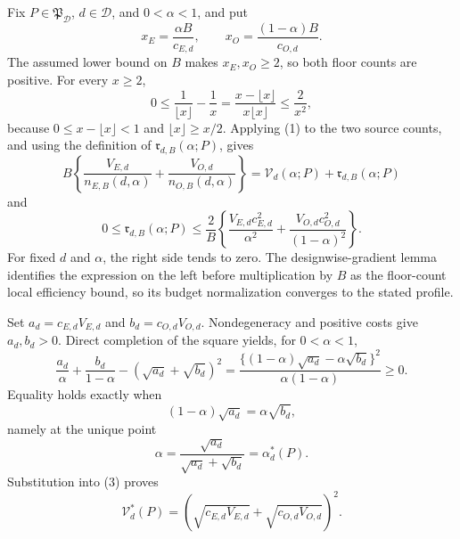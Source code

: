 Fix \(P\in\mathfrak P_{\mathcal D}\), \(d\in\mathcal D\), and \(0<\alpha<1\), and put
\[
 x_E=\frac{\alpha B}{c_{E,d}},\qquad
 x_O=\frac{(1-\alpha)B}{c_{O,d}}.
\]
The assumed lower bound on \(B\) makes \(x_E,x_O\ge2\), so both floor counts are positive.  For every \(x\ge2\),
\[
 0\le \frac1{\lfloor x\rfloor}-\frac1x
 =\frac{x-\lfloor x\rfloor}{x\lfloor x\rfloor}
 \le \frac{2}{x^2}, \tag{1}
\]
because \(0\le x-\lfloor x\rfloor<1\) and \(\lfloor x\rfloor\ge x/2\).  Applying (1) to the two source counts, and using the definition of \(\mathfrak r_{d,B}(\alpha;P)\), gives
\[
 B\left\{\frac{V_{E,d}}{n_{E,B}(d,\alpha)}
 +\frac{V_{O,d}}{n_{O,B}(d,\alpha)}\right\}
 =\mathcal V_d(\alpha;P)+\mathfrak r_{d,B}(\alpha;P)
\]
and
\[
 0\le\mathfrak r_{d,B}(\alpha;P)
 \le\frac2B\left\{
 \frac{V_{E,d}c_{E,d}^2}{\alpha^2}
 +\frac{V_{O,d}c_{O,d}^2}{(1-\alpha)^2}\right\}. \tag{2}
\]
For fixed \(d\) and \(\alpha\), the right side tends to zero.  The designwise-gradient lemma identifies the expression on the left before multiplication by \(B\) as the floor-count local efficiency bound, so its budget normalization converges to the stated profile.

Set \(a_d=c_{E,d}V_{E,d}\) and \(b_d=c_{O,d}V_{O,d}\).  Nondegeneracy and positive costs give \(a_d,b_d>0\).  Direct completion of the square yields, for \(0<\alpha<1\),
\[
 \frac{a_d}{\alpha}+\frac{b_d}{1-\alpha}
 -(\sqrt{a_d}+\sqrt{b_d})^2
 =\frac{\{(1-\alpha)\sqrt{a_d}-\alpha\sqrt{b_d}\}^2}
        {\alpha(1-\alpha)}\ge0. \tag{3}
\]
Equality holds exactly when
\[
 (1-\alpha)\sqrt{a_d}=\alpha\sqrt{b_d},
\]
namely at the unique point
\[
 \alpha=\frac{\sqrt{a_d}}{\sqrt{a_d}+\sqrt{b_d}}
 =\alpha_d^*(P).
\]
Substitution into (3) proves
\[
 \mathcal V_d^*(P)
 =\left(\sqrt{c_{E,d}V_{E,d}}+\sqrt{c_{O,d}V_{O,d}}\right)^2.
\]